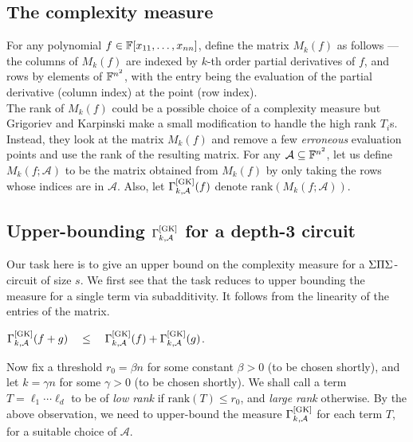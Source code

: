 \subsection{The complexity measure}

For any polynomial $f \in \mathbb{F}[x_{11},\dots, x_{nn}]$, define the matrix
$M_k(f)$ as follows --- the columns of $M_k(f)$ are indexed by $k$-th
order partial derivatives of $f$, and rows by elements of $\mathbb{F}^{n^2}$,
with the entry being the evaluation of the partial derivative (column
index) at the point (row index).\\

The rank of $M_k(f)$ could be a possible choice of a complexity
measure but Grigoriev and Karpinski make a small
modification to handle the high rank $T_i$s. Instead, they look at the matrix $M_k(f)$ and remove a
few \emph{erroneous} evaluation points and use the rank of the
resulting matrix. For any $\mathcal{A}\subseteq \mathbb{F}^{n^2}$, let us
define $M_k(f;\mathcal{A})$ to be the matrix obtained from $M_k(f)$ by
only taking the rows whose indices are in
$\mathcal{A}$. Also, let $\Gamma^{\mathrm{[GK]}}_{k,\mathcal{A}}(f)$
denote $\mathrm{rank}(M_k(f;\mathcal{A}))$.



\subsection{Upper-bounding $\Gamma^{\mathrm{[GK]}}_{k,\mathcal{A}}$ for a depth-3 circuit}\label{sec:gk-upper-bound}

Our task here is to give an upper bound on the complexity measure for
	a $\Sigma\Pi\Sigma$-circuit of size $s$. We first see that the task reduces to 
	upper bounding the measure for a single term via subadditivity. It 
	follows from the linearity of the entries of the matrix. 

\begin{observation}\label{obs:GK-subadditivity}
  $\Gamma^{\mathrm{[GK]}}_{k,\mathcal{A}}(f + g) \quad\leq\quad
  \Gamma^{\mathrm{[GK]}}_{k,\mathcal{A}}(f) +
  \Gamma^{\mathrm{[GK]}}_{k,\mathcal{A}}(g)$.
\end{observation}

Now fix a threshold $r_0 = \beta n$ for some constant $\beta > 0$ (to be
chosen shortly), and let $k = \gamma n$ for some $\gamma>0$ (to be
chosen shortly). We shall call a term $T = \ell_1\cdots \ell_d$ to be
of \emph{low rank} if $\mathrm{rank}(T) \leq r_0$, and \emph{large rank}
otherwise. By the above observation, we need to upper-bound the measure $\Gamma^{\mathrm{[GK]}}_{k,\mathcal{A}}$ for each term $T$, for a
suitable choice of $\mathcal{A}$.\\

